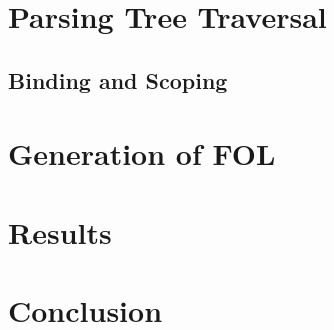 \documentclass{article}
\begin{document}
{{		%

	}
}

\section{Parsing Tree Traversal}{
	\subsection{Binding and Scoping}{}
}

\section{Generation of FOL}{}

\section{Results}{}

\section{Conclusion}{}



\citation
\end{document}
